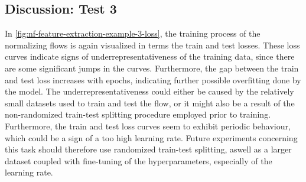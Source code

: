 \documentclass[a4paper,12pt]{report}
\def\lk#1{{\color{black}{#1}}}
\begin{document}
\subsection{Discussion: Test 3}
In \cref{fig:nf-feature-extraction-example-3-loss}, the training process of the normalizing flows is again visualized in terms \lk{of} the train and test losses. These loss curves indicate signs of underrepresentativeness of the training data, since there are some significant jumps in the curves. Furthermore, the gap between the train and test loss increases with epochs, indicating further possible overfitting done by the model. The underrepresentativeness could either be caused by the relatively small datasets used to train and test the flow, or it might also be a result of the non-randomized train-test splitting procedure employed prior to training. Furthermore, the train and test loss curves seem to exhibit periodic behaviour, which could be a sign of a too high learning rate. Future experiments concerning this task should therefore use randomized train-test splitting, aswell as a larger dataset coupled with fine-tuning of the hyperparameters, especially of the learning rate.
\end{document}
